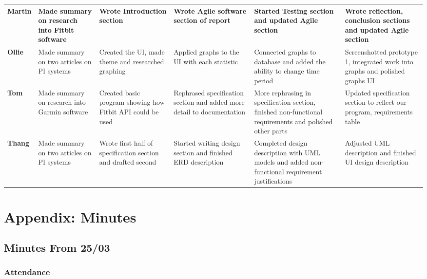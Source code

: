 \documentclass[12pt]{article}
\begin{document}
\newpage

\begin{table}[!ht]
\begin{adjustwidth}{-3cm}{-3cm}
\centering
\begin{tabular}{|p{1.5cm}|p{3.1cm}|p{3cm}|p{3cm}|p{3cm}|p{3cm}|}
\hline
\textbf{Martin} & Made summary on research into Fitbit software & Wrote Introduction section & Wrote Agile software section of report & Started Testing section and updated Agile section & Wrote reflection, conclusion sections and updated Agile section  \\
\hline
\textbf{Ollie} & Made summary on two articles on PI systems & Created the UI, made theme and researched graphing & Applied graphs to the UI with each statistic & Connected graphs to database and added the ability to change time period & Screenshotted prototype 1, integrated work into graphs and polished graphs UI\\
\hline
\textbf{Tom} & Made summary on research into Garmin software & Created basic program showing how Fitbit API could be used & Rephrased specification section and added more detail to documentation & More rephrasing in specification section, finished non-functional requirements and polished other parts & Updated specification section to reflect our program, requirements table \\
\hline
\textbf{Thang} &  Made summary on two articles on PI systems & Wrote first half of specification section and drafted second & Started writing design section and finished ERD description & Completed design description with UML models and added non-functional requirement justifications & Adjusted UML description and finished UI design description \\
\hline
\end{tabular}
\end{adjustwidth}
\end{table}


\newpage
\section{Appendix: Minutes}
\newcommand{\tightlist}{}

\hypertarget{minutes-from-2503}{%
\subsection{Minutes From 25/03}\label{minutes-from-2503}}

\hypertarget{attendance}{%
\subsubsection{Attendance}\label{attendance}}
\end{document}
